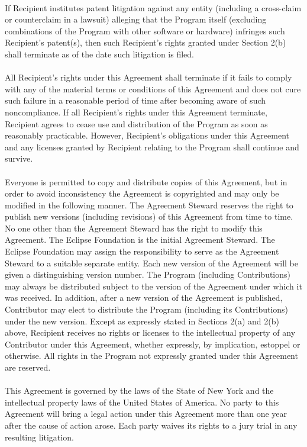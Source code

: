 \documentclass[a4paper, 12pt]{book}
\begin{document}
\\
If Recipient institutes patent litigation against any entity (including a cross-claim or counterclaim in a lawsuit) alleging that the Program itself (excluding combinations of the Program with other software or hardware) infringes such Recipient's patent(s), then such Recipient's rights granted under Section 2(b) shall terminate as of the date such litigation is filed.\\
\\
All Recipient's rights under this Agreement shall terminate if it fails to comply with any of the material terms or conditions of this Agreement and does not cure such failure in a reasonable period of time after becoming aware of such noncompliance. If all Recipient's rights under this Agreement terminate, Recipient agrees to cease use and distribution of the Program as soon as reasonably practicable. However, Recipient's obligations under this Agreement and any licenses granted by Recipient relating to the Program shall continue and survive.\\
\\
Everyone is permitted to copy and distribute copies of this Agreement, but in order to avoid inconsistency the Agreement is copyrighted and may only be modified in the following manner. The Agreement Steward reserves the right to publish new versions (including revisions) of this Agreement from time to time. No one other than the Agreement Steward has the right to modify this Agreement. The Eclipse Foundation is the initial Agreement Steward. The Eclipse Foundation may assign the responsibility to serve as the Agreement Steward to a suitable separate entity. Each new version of the Agreement will be given a distinguishing version number. The Program (including Contributions) may always be distributed subject to the version of the Agreement under which it was received. In addition, after a new version of the Agreement is published, Contributor may elect to distribute the Program (including its Contributions) under the new version. Except as expressly stated in Sections 2(a) and 2(b) above, Recipient receives no rights or licenses to the intellectual property of any Contributor under this Agreement, whether expressly, by implication, estoppel or otherwise. All rights in the Program not expressly granted under this Agreement are reserved.\\
\\
This Agreement is governed by the laws of the State of New York and the intellectual property laws of the United States of America. No party to this Agreement will bring a legal action under this Agreement more than one year after the cause of action arose. Each party waives its rights to a jury trial in any resulting litigation.\\
\\
\end{document}
